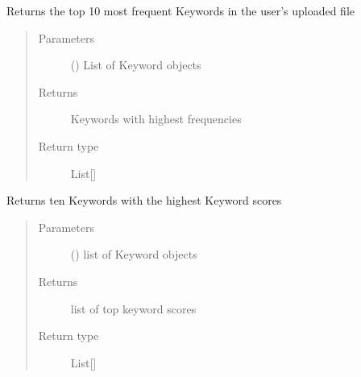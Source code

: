 \documentclass[letterpaper,10pt,english]{sphinxmanual}
\begin{document}

\begin{fulllineitems}
\label{\detokenize{functionsv1:common_functions.kwhighestfrequencies}}
Returns the top 10 most frequent Keywords in the user’s uploaded file
\begin{quote}\begin{description}
\item[{Parameters}] \leavevmode
{} ({\hyperref[\detokenize{KeywordList:module-KeywordList}]{}}) \textendash{} List of Keyword objects

\item[{Returns}] \leavevmode
Keywords with highest frequencies

\item[{Return type}] \leavevmode
List{[}{\hyperref[\detokenize{Keyword:module-Keyword}]{}}{]}

\end{description}\end{quote}

\end{fulllineitems}


\begin{fulllineitems}
\label{\detokenize{functionsv1:common_functions.kwhighestkeyscores}}
Returns ten Keywords with the highest Keyword scores
\begin{quote}\begin{description}
\item[{Parameters}] \leavevmode
{} ({\hyperref[\detokenize{KeywordList:module-KeywordList}]{}}) \textendash{} list of Keyword objects

\item[{Returns}] \leavevmode
list of top keyword scores

\item[{Return type}] \leavevmode
List{[}{\hyperref[\detokenize{Keyword:module-Keyword}]{}}{]}

\end{description}\end{quote}

\end{fulllineitems}
\end{document}
